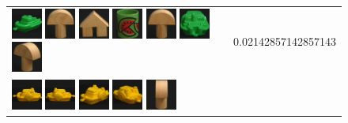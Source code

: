 \begin{figure}[tbp]
\begin{center}
\begin{tabular}{m{11cm} | m{3cm} |}
\includegraphics[width=1cm]{coil/beeld-57.eps}
\includegraphics[width=1cm]{coil/beeld-0.eps}
\includegraphics[width=1cm]{coil/beeld-42.eps}
\includegraphics[width=1cm]{coil/beeld-32.eps}
\includegraphics[width=1cm]{coil/beeld-1.eps}
\includegraphics[width=1cm]{coil/beeld-59.eps}
\includegraphics[width=1cm]{coil/beeld-4.eps}
& {\scriptsize 0.02142857142857143}
\\
\includegraphics[width=1cm]{coil/beeld-12.eps}
\includegraphics[width=1cm]{coil/beeld-13.eps}
\includegraphics[width=1cm]{coil/beeld-15.eps}
\includegraphics[width=1cm]{coil/beeld-16.eps}
\includegraphics[width=1cm]{coil/beeld-5.eps}

\end{tabular}
\end{center}
\end{figure}
